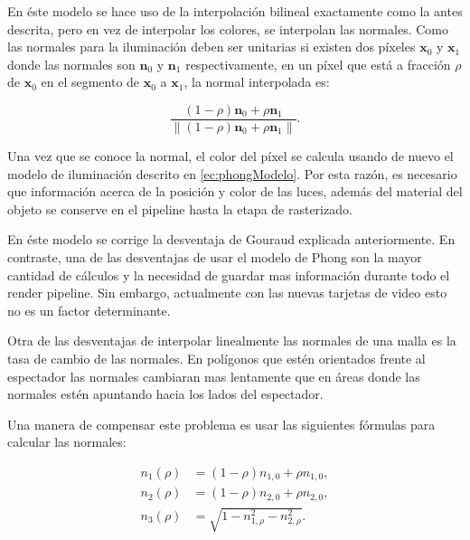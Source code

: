 En éste modelo se hace uso de la interpolación bilineal exactamente como la antes descrita, pero en vez de interpolar los colores, se interpolan las normales. Como las normales para la iluminación deben ser unitarias si existen dos píxeles  $\textbf{x}_0$ y $\textbf{x}_1$ donde las normales son $\textbf{n}_0$ y $\textbf{n}_1$ respectivamente, en un píxel que está a fracción $\rho$ de $\textbf{x}_0$ en el segmento de $\textbf{x}_0$ a $\textbf{x}_1$, la normal interpolada es:

\begin{equation}
  \dfrac{(1 - \rho)\textbf{n}_0 + \rho \textbf{n}_1}{\lVert (1 - \rho)\textbf{n}_0 + \rho \textbf{n}_1 \rVert}.
  \label{ec:phongShading}
\end{equation}

Una vez que se conoce la normal, el color del píxel se calcula usando de nuevo el modelo de iluminación descrito en \eqref{ec:phongModelo}. Por esta razón, es necesario que información acerca de la posición y color de las luces, además del material del objeto se conserve en el pipeline hasta la etapa de rasterizado. 

En éste modelo se corrige la desventaja de Gouraud explicada anteriormente. En contraste, una de las desventajas de usar el modelo de Phong son la mayor cantidad de cálculos y la necesidad de guardar mas información durante todo el render pipeline. Sin embargo, actualmente con las nuevas tarjetas de video esto no es un factor determinante.

Otra de las desventajas de interpolar linealmente las normales de una malla es la tasa de cambio de las normales. En polígonos que estén orientados frente al espectador las normales cambiaran mas lentamente que en áreas donde las normales estén apuntando hacia los lados del espectador.

Una manera de compensar este problema es usar las siguientes fórmulas para calcular las normales:

\begin{eqnarray}
  \nonumber
  n_{1}(\rho) & = (1 - \rho)n_{1,0} + \rho n_{1, 0}, \\
  \nonumber
  n_{2}(\rho) & = (1 - \rho)n_{2,0} + \rho n_{2, 0}, \\
  n_{3}(\rho) & = \sqrt{1 - n_{1, \rho}^{2} - n_{2, \rho}^{2}}.
  \label{ec:phongShadingCorrection}
\end{eqnarray}

